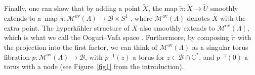 Finally, one can show that by adding a point $\widetilde{X}$, the map $\widetilde{\pi}\colon\widetilde{X}\to \widetilde{U}$ smoothly extends to a~map $\widetilde{\pi}\colon \mathcal{M}^{\text{ov}}(\Lambda)\to \mathcal{B}\times S^1$ \cite[Proposition 3.2]{GW}, where $\mathcal{M}^{\text{ov}}(\Lambda)$ denotes $\widetilde{X}$ with the extra point. The hyperk\"ahler structure of $\widetilde{X}$ also smoothly extends to $\mathcal{M}^{\text{ov}}(\Lambda)$, which is what we call the Ooguri--Vafa space \cite[Section 4.1]{GMN1}. Furthermore, by composing $\widetilde{\pi}$ with the projection into the first factor, we can think of $\mathcal{M}^{\text{ov}}(\Lambda)$ as a singular torus fibration $p\colon\mathcal{M}^{\text{ov}}(\Lambda)\to \mathcal{B}$, with $p^{-1}(z)$ a torus for $z\in \mathcal{B}\cap \mathbb{C}^*$, and $p^{-1}(0)$ a torus with a node (see Figure~\ref{fig1} from the introduction).

